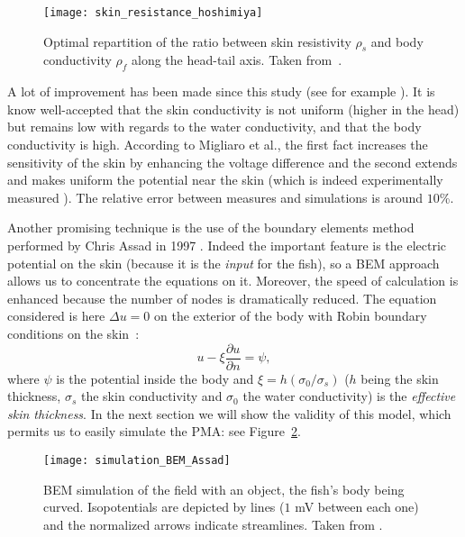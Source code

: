 %
\begin{figure}
\centering\texttt{[image: skin\_resistance\_hoshimiya]}

\caption{Optimal repartition of the ratio between skin resistivity $\rho_{s}$
and body conductivity $\rho_{f}$ along the head-tail axis. Taken
from~\cite{hoshimiya1980theapteronotus}. \label{fig:skin_resistance_hoshimiya}}

\end{figure}


A lot of improvement has been made since this study (see for
example
\cite{babineau2006modeling,maciver2001computational,migliaro2005theoretical,rasnow1989simulation}).
It is know well-accepted that the skin conductivity is not uniform
(higher in the head) but remains low with regards to the water
conductivity, and that the body conductivity is high. According to
Migliaro et al.\noun{ }\cite{migliaro2005theoretical}, the first
fact increases the sensitivity of the skin by enhancing the
voltage difference and the second extends and makes uniform the
potential near the skin (which is indeed experimentally measured
\cite{nelson-target}). The relative error between measures and
simulations is around $10$\%.

Another promising technique is the use of the boundary elements
method performed by Chris Assad in 1997 \cite{assad1997phd}.
Indeed the important feature is the electric potential on the skin
(because it is the \emph{input} for the fish), so a BEM approach
allows us to concentrate the equations on it. Moreover, the speed
of calculation is enhanced because the number of nodes is
dramatically reduced. The equation considered is here $\Delta u=0$
on the exterior of the body with Robin boundary conditions on the
skin~\cite{williams1990hypercube}:\begin{equation}
u-\xi\frac{\partial u}{\partial
n}=\psi,\label{eq:CL_assad}\end{equation} where $\psi$ is the
potential inside the body and
$\xi=h\left(\sigma_{0}/\sigma_{s}\right)$ ($h$ being the skin
thickness, $\sigma_{s}$ the skin conductivity and $\sigma_{0}$ the
water conductivity) is the \emph{effective skin thickness}. In the
next section we will show the validity of this model, which
permits us to easily simulate the PMA: see
Figure~\ref{fig:simulation_bem_assad}.

%
\begin{figure}
\centering\texttt{[image: simulation\_BEM\_Assad]}

\caption{BEM simulation of the field with an object, the fish's
body being curved. Isopotentials are depicted by lines ($1$ mV
between each one) and the normalized arrows indicate streamlines.
Taken from \cite{assad1998electric}.
\label{fig:simulation_bem_assad}}

\end{figure}


